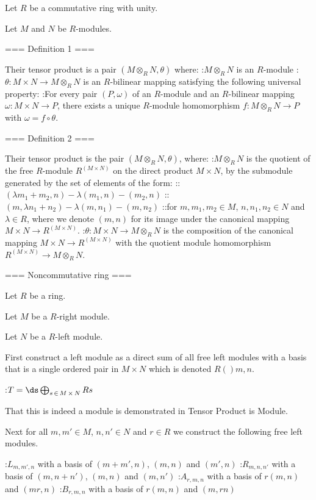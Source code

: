 Let $R$ be a commutative ring with unity.

Let $M$ and $N$ be $R$-modules.


=== Definition 1 ===

Their tensor product is a pair $\left( M \otimes_R N, \theta \right)$ where:
:$M \otimes_R N$ is an $R$-module
:$\theta : M \times N \to M \otimes_R N$ is an $R$-bilinear mapping
satisfying the following universal property:
:For every pair $\left( P, \omega \right)$ of an $R$-module and an $R$-bilinear mapping $\omega : M \times N \to P$, there exists a unique $R$-module homomorphism $f: M \otimes_R N \to P$ with $\omega = f \circ \theta$.


=== Definition 2 ===

Their tensor product is the pair $\left( M \otimes_R N, \theta \right)$, where:
:$M \otimes_R N$ is the quotient of the free $R$-module $R^{\left( M \times N \right) }$ on the direct product $M \times N$, by the submodule generated by the set of elements of the form:
::$\left( \lambda m_1 + m_2, n \right) - \lambda \left( m_1, n \right) - \left( m_2, n \right)$
::$\left( m, \lambda n_1 + n_2 \right) - \lambda \left( m, n_1 \right) - \left( m, n_2 \right)$
::for $m, m_1, m_2 \in M$, $n, n_1, n_2 \in N$ and $\lambda \in R$, where we denote $\left( m, n \right)$ for its image under the canonical mapping $M \times N \to R^{\left( M \times N \right) }$.
:$\theta : M \times N \to M \otimes_R N$ is the composition of the canonical mapping $M \times N \to R^{\left( M \times N \right) }$ with the quotient module homomorphism $R^{\left( M \times N \right) } \to M \otimes_R N$.


=== Noncommutative ring ===

Let $R$ be a ring.

Let $M$ be a $R$-right module.

Let $N$ be a $R$-left module.


First construct a left module as a direct sum of all free left modules with a basis that is a single ordered pair in $M \times N$ which is denoted $R \left(   \right){m, n}$.

:$T = \ds \bigoplus_{s \mathop \in M \mathop \times N} R s$


That this is indeed a module is demonstrated in Tensor Product is Module.


Next for all $m, m' \in M$, $n, n' \in N$ and $r \in R$ we construct the following free left modules.

:$L_{m, m', n}$ with a basis of $\left( m + m', n \right)$, $\left( m, n \right)$ and $\left( m', n \right)$
:$R_{m, n, n'}$ with a basis of $\left( m, n + n' \right)$, $\left( m, n \right)$ and $\left( m, n' \right)$
:$A_{r, m, n}$ with a basis of $r \left( m, n \right)$ and $\left( m r, n \right)$
:$B_{r, m, n}$ with a basis of $r \left( m, n \right)$ and $\left( m, r n \right)$

